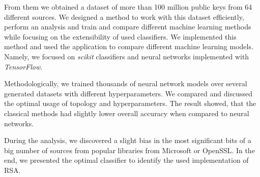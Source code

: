 From them we obtained a dataset of more than 100 million public keys from 64 different sources. We designed a method to work with this dataset efficiently, perform an analysis and train and compare different machine learning methods while focusing on the extensibility of used classifiers. We implemented this method and used the application to compare different machine learning models. Namely, we focused on \textit{scikit} classifiers and neural networks implemented with \textit{TensorFlow}. 

Methodologically, we trained thousands of neural network models over several generated datasets with different hyperparameters. We compared and discussed the optimal usage of topology and hyperparameters. The result showed, that the classical methods had slightly lower overall accuracy when compared to neural networks. 

During the analysis, we discovered a slight bias in the most significant bits of a big number of sources from popular libraries from Microsoft or OpenSSL. In the end, we presented the optimal classifier to identify the used implementation of RSA.
